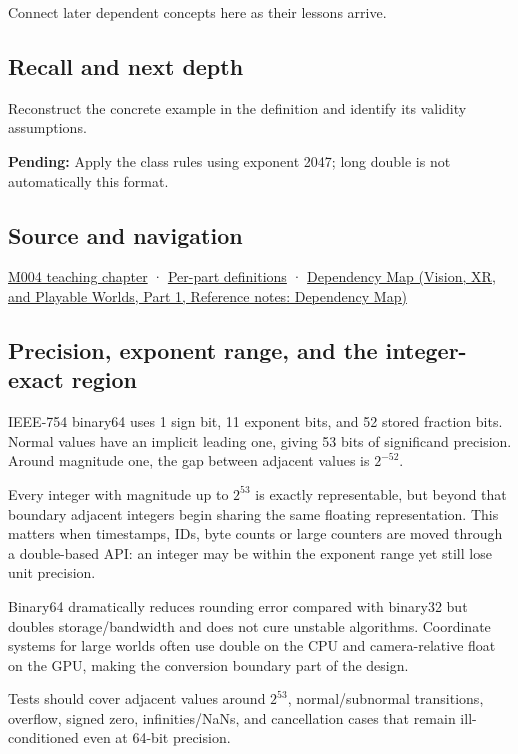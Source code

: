Connect later dependent concepts here as their lessons arrive.

\subsection{Recall and next depth}\label{appendix-5078dfab64e6-recall-and-next-depth}

\hypertarget{appendix-5078dfab64e6-recall-and-next-depth}{}

Reconstruct the concrete example in the definition and identify its validity assumptions.

\textbf{Pending:} Apply the class rules using exponent 2047; long double is not automatically this format.

\subsection{Source and navigation}\label{appendix-5078dfab64e6-source-and-navigation}

\hypertarget{appendix-5078dfab64e6-source-and-navigation}{}

\hyperref[01-foundations-i-ch001-a-stretching-ruler-for-real-valued-quantities]{M004 teaching chapter} · \hyperref[appendix-fd090d982a15-m004---parts-61-76]{Per-part definitions} · \href{../07-Vision-XR-and-Playable-Worlds-P01/main.pdf\#nameddest=appendix-4ad47bdd269a}{Dependency Map (Vision, XR, and Playable Worlds, Part 1, Reference notes: Dependency Map)}

\subsection{Precision, exponent range, and the integer-exact region}\label{appendix-5078dfab64e6-precision-exponent-range-and-the-integer-exact-region}

\hypertarget{appendix-5078dfab64e6-precision-exponent-range-and-the-integer-exact-region}{}

IEEE-754 binary64 uses 1 sign bit, 11 exponent bits, and 52 stored fraction bits. Normal values have an implicit leading one, giving 53 bits of significand precision. Around magnitude one, the gap between adjacent values is \(2^{-52}\).

Every integer with magnitude up to \(2^{53}\) is exactly representable, but beyond that boundary adjacent integers begin sharing the same floating representation. This matters when timestamps, IDs, byte counts or large counters are moved through a double-based API: an integer may be within the exponent range yet still lose unit precision.

Binary64 dramatically reduces rounding error compared with binary32 but doubles storage/bandwidth and does not cure unstable algorithms. Coordinate systems for large worlds often use double on the CPU and camera-relative float on the GPU, making the conversion boundary part of the design.

Tests should cover adjacent values around \(2^{53}\), normal/subnormal transitions, overflow, signed zero, infinities/NaNs, and cancellation cases that remain ill-conditioned even at 64-bit precision.

